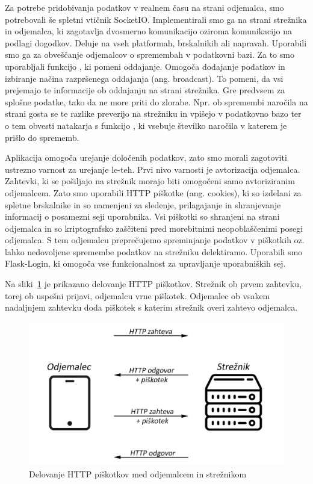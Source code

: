 \documentclass[a4paper, 12pt]{book}
\begin{document}
Za potrebe pridobivanja podatkov v realnem času na strani odjemalca, smo potrebovali še spletni vtičnik SocketIO. Implementirali smo ga na strani strežnika in odjemalca, ki zagotavlja dvosmerno komunikacijo oziroma komunikacijo na podlagi dogodkov. Deluje na vseh platformah, brskalnikih ali napravah. Uporabili smo ga za obveščanje odjemalcov o spremembah v podatkovni bazi. Za to smo uporabljali funkcijo , ki pomeni oddajanje. Omogoča dodajanje podatkov in izbiranje načina razpršenega oddajanja (ang. broadcast). To pomeni, da vsi prejemajo te informacije ob oddajanju na strani strežnika. Gre predvsem za splošne podatke, tako da ne more priti do zlorabe. Npr. ob spremembi naročila na strani gosta se te razlike preverijo na strežniku in vpišejo v podatkovno bazo ter o tem obvesti natakarja s funkcijo , ki vsebuje številko naročila v katerem je prišlo do sprememb. 
	

Aplikacija omogoča urejanje določenih podatkov, zato smo morali zagotoviti ustrezno varnost za urejanje le-teh. Prvi nivo varnosti je avtorizacija odjemalca. Zahtevki, ki se pošiljajo na strežnik morajo biti omogočeni samo avtoriziranim odjemalcem. Zato smo uporabili HTTP piškotke (ang. cookies), ki so izdelani za spletne brskalnike in so namenjeni za sledenje, prilagajanje in shranjevanje informacij o posamezni seji uporabnika. Vsi piškotki so shranjeni na strani odjemalca in so kriptografsko zaščiteni pred morebitnimi neopoblaščenimi posegi odjemalca. S tem odjemalcu preprečujemo spreminjanje podatkov v piškotkih oz. lahko nedovoljene spremembe podatkov na strežniku delektiramo. Uporabili smo Flask-Login, ki omogoča vse funkcionalnost za upravljanje uporabniških sej. 

Na sliki~\ref{Cookies} je prikazano delovanje HTTP piškotkov. Strežnik ob prvem zahtevku, torej ob uspešni prijavi, odjemalcu vrne piškotek. Odjemalec ob vsakem nadaljnjem zahtevku doda piškotek s katerim strežnik overi zahtevo odjemalca.

\begin{figure}[!htb]
\begin{center}
\includegraphics[width=14cm]{cookie-how1.png}
\caption{Delovanje HTTP piškotkov med odjemalcem in strežnikom}
\label{Cookies}
\end{center}
\end{figure}
\end{document}
